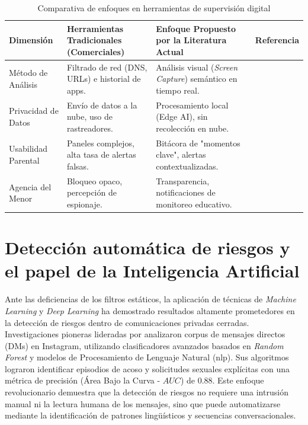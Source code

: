 \begin{table}[h!]
\centering
\caption{Comparativa de enfoques en herramientas de supervisión digital}
\begin{tabular}{|p{3cm}|p{4.5cm}|p{4.5cm}|p{2cm}|}
\hline
\textbf{Dimensión} & \textbf{Herramientas Tradicionales (Comerciales)} & \textbf{Enfoque Propuesto por la Literatura Actual} & \textbf{Referencia} \\ \hline
Método de Análisis & Filtrado de red (DNS, URLs) e historial de apps. & Análisis visual (\textit{Screen Capture}) semántico en tiempo real. & \cite{rojas_technical_2025} \\ \hline
Privacidad de Datos & Envío de datos a la nube, uso de rastreadores. & Procesamiento local (Edge AI), sin recolección en nube. & \cite{feal_angel_2020} \\ \hline
Usabilidad Parental & Paneles complejos, alta tasa de alertas falsas. & Bitácora de "momentos clave", alertas contextualizadas. & \cite{gnanasekaran_usability_2023} \\ \hline
Agencia del Menor & Bloqueo opaco, percepción de espionaje. & Transparencia, notificaciones de monitoreo educativo. & \cite{dumaru_its_2024} \\ \hline
\end{tabular}
\end{table}

\section{Detección automática de riesgos y el papel de la Inteligencia Artificial}

Ante las deficiencias de los filtros estáticos, la aplicación de técnicas de \textit{Machine Learning} y \textit{Deep Learning} ha demostrado resultados altamente prometedores en la detección de riesgos dentro de comunicaciones privadas cerradas. Investigaciones pioneras lideradas por \cite{razi_sliding_2023} analizaron corpus de mensajes directos (DMs) en Instagram, utilizando clasificadores avanzados basados en \textit{Random Forest} y modelos de Procesamiento de Lenguaje Natural (\gls{nlp}). Sus algoritmos lograron identificar episodios de acoso y solicitudes sexuales explícitas con una métrica de precisión (Área Bajo la Curva - $AUC$) de 0.88. Este enfoque revolucionario demuestra que la detección de riesgos no requiere una intrusión manual ni la lectura humana de los mensajes, sino que puede automatizarse mediante la identificación de patrones lingüísticos y secuencias conversacionales.\\



